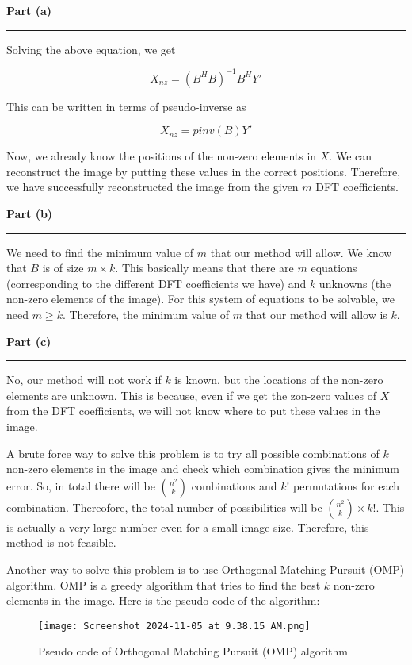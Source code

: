 \documentclass[a4paper,14pt]{article}
\newenvironment{solution}[2][]{%
    \begin{mdframed}[linecolor=blue!70!black, linewidth=2pt, roundcorner=10pt, backgroundcolor=yellow!10!white, skipabove=12pt, skipbelow=12pt]%
        \textbf{\large #2}
        \par\noindent\rule{\textwidth}{0.4pt}
}{
    \end{mdframed}
}
\begin{document}
\begin{solution}{Part (a)}
Solving the above equation, we get

\begin{equation}
    X_{nz} = (B^HB)^{-1}B^HY'
\end{equation}

This can be written in terms of pseudo-inverse as

\begin{equation}
    X_{nz} = pinv(B)Y'
\end{equation}

Now, we already know the positions of the non-zero elements in $X$. We can reconstruct the image by putting these values in the correct positions. Therefore, we have successfully reconstructed the image from the given $m$ DFT coefficients.
\end{solution}

\begin{solution}{Part (b)}
    We need to find the minimum value of $m$ that our method will allow. We know that $B$ is of size $m \times k$. This basically means that there are $m$ equations (corresponding to the different DFT coefficients we have) and $k$ unknowns (the non-zero elements of the image). For this system of equations to be solvable, we need $m \geq k$. Therefore, the minimum value of $m$ that our method will allow is $k$.
\end{solution}

\begin{solution}{Part (c)}
  No, our method will not work if $k$ is known, but the locations of the non-zero elements are unknown. This is because, even if we get the zon-zero values of $X$ from the DFT coefficients, we will not know where to put these values in the image. 

  A brute force way to solve this problem is to try all possible combinations of $k$ non-zero elements in the image and check which combination gives the minimum error. So, in total there will be $\binom{n^2}{k}$ combinations and $k!$ permutations for each combination. Thereofore, the total number of possibilities will be $\binom{n^2}{k} \times k!$. This is actually a very large number even for a small image size. Therefore, this method is not feasible.

  Another way to solve this problem is to use Orthogonal Matching Pursuit (OMP) algorithm. OMP is a greedy algorithm that tries to find the best $k$ non-zero elements in the image. Here is the pseudo code of the algorithm:

  \begin{figure}[H]
    \centering
    \texttt{[image: Screenshot 2024-11-05 at 9.38.15 AM.png]}
    \caption{Pseudo code of Orthogonal Matching Pursuit (OMP) algorithm}
    \label{fig:omp}
  \end{figure}
\end{solution}
\end{document}
